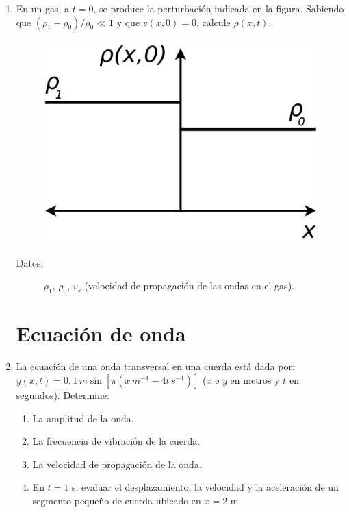 \documentclass[11pt,spanish,a4paper]{article}
\begin{document}
\begin{enumerate}
\item En un gas, a $t=0$, se produce la perturbación indicada en la figura.
Sabiendo que $(\rho_{1}-\rho_{0})/\rho_{0}\ll1$ y que $v(x,0)=0$,
calcule $\rho(x,t)$.
\begin{figure}[H]
\centering{}\includegraphics[clip,scale=0.25]{ej2-5}
\end{figure}
\begin{description}
\item [{Datos:}] $\rho_{1}$, $\rho_{0}$, $v_{s}$ (velocidad de propagación
de las ondas en el gas).
\end{description}


\section*{Ecuación de onda}

\item La ecuación de una onda transversal en una cuerda está dada por: $y(x,t)=0,1\unit{\, m}\sin\left[\pi\left(x\unit{\, m^{-1}- 4 t \unit{\, s^{-1}}}\right)\right]$
($x$ e $y$ en metros y $t$ en segundos). Determine:
\begin{enumerate}
\item La amplitud de la onda.
\item La frecuencia de vibración de la cuerda.
\item La velocidad de propagación de la onda.
\item En $t=1$ s, evaluar el desplazamiento, la velocidad y la aceleración
de un segmento pequeño de cuerda ubicado en $x=2$ m.
\end{enumerate}



\end{enumerate}
\end{document}
